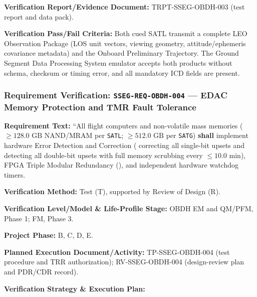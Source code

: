 \par\textbf{Verification Report/Evidence Document:} TRPT-SSEG-OBDH-003 (test report and data pack).
\par\textbf{Verification Pass/Fail Criteria:} Both cued SATL transmit a complete LEO Observation Package (LOS unit vectors, viewing geometry, attitude/ephemeris covariance metadata) and the Onboard Preliminary Trajectory. The Ground Segment Data Processing System emulator accepts both products without schema, checksum or timing error, and all mandatory ICD fields are present.
\par\medskip
\subsubsection{Requirement Verification: \texttt{SSEG-REQ-OBDH-004} --- EDAC Memory Protection and TMR Fault Tolerance}
\label{ver:SSEG-REQ-OBDH-004}
\textbf{Requirement Text:} ``All  flight computers and non-volatile mass memories ($\ge 128.0\text{ GB}$ NAND/MRAM per \texttt{SATL}; $\ge 512.0\text{ GB}$ per \texttt{SATG}) \textbf{shall} implement hardware Error Detection and Correction ( correcting all single-bit upsets and detecting all double-bit upsets with full memory scrubbing every $\le 10.0\text{ min}$), FPGA Triple Modular Redundancy (), and independent hardware watchdog timers.
\par\textbf{Verification Method:} Test (T), supported by Review of Design (R).
\par\textbf{Verification Level/Model \& Life-Profile Stage:} OBDH EM and QM/PFM, Phase 1; FM, Phase 3.
\par\textbf{Project Phase:} B, C, D, E.
\par\textbf{Planned Execution Document/Activity:} TP-SSEG-OBDH-004 (test procedure and TRR authorization); RV-SSEG-OBDH-004 (design-review plan and PDR/CDR record).
\par\textbf{Verification Strategy \& Execution Plan:}
